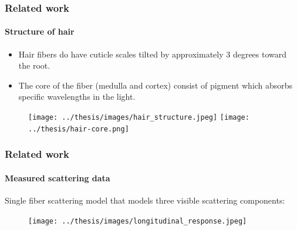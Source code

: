 \documentclass{beamer}
\begin{document}
  
  \begin{frame}
    \frametitle{Related work}
	\framesubtitle{Structure of hair}
	
	\begin{itemize}
	\item Hair fibers do have cuticle scales tilted by approximately 3 degrees toward the root.
	\item The core of the fiber (medulla and cortex) consist of pigment which absorbs specific wavelengths in the light.
	\end{itemize}
	
	\begin{figure}
	\texttt{[image: ../thesis/images/hair\_structure.jpeg]}
	\texttt{[image: ../thesis/hair-core.png]}
	\end{figure}
  \end{frame}
  
  
  \begin{frame}
    \frametitle{Related work}
    \framesubtitle{Measured scattering data}
    Single fiber scattering model that models three visible scattering components:
    
    \begin{figure}
    \centering
    \texttt{[image: ../thesis/images/longitudinal\_response.jpeg]}
    \end{figure}
  \end{frame}
  
\end{document}
